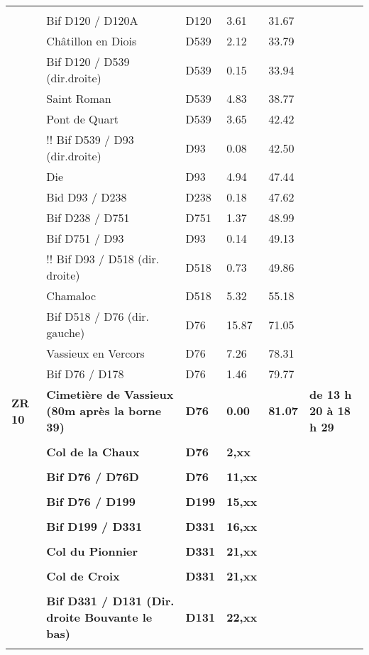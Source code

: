 \documentclass{article}%
\begin{document}
\begin{longtable}{p{2.25cm}|p{6.7cm}|p{2.0cm}|p{1.5cm}|p{1.5cm}|p{3.5cm}}
 & & & & & \\%
 &Bif D120 / D120A&D120&3.61&31.67& \\%
 &Châtillon en Diois&D539&2.12&33.79& \\%
 &Bif D120 / D539 (dir.droite)&D539&0.15&33.94& \\%
 &Saint Roman &D539&4.83&38.77& \\%
 &Pont de Quart&D539&3.65&42.42& \\%
 &!! Bif D539 / D93 (dir.droite)&D93&0.08&42.50& \\%
 &Die&D93&4.94&47.44& \\%
 &Bid D93 / D238&D238&0.18&47.62& \\%
 &Bif D238 / D751 &D751&1.37&48.99& \\%
 &Bif D751 / D93&D93&0.14&49.13& \\%
 &!! Bif D93 / D518 (dir. droite)&D518&0.73&49.86& \\%
 &Chamaloc&D518&5.32&55.18& \\%
 &Bif D518 / D76 (dir. gauche)&D76&15.87&71.05& \\%
 &Vassieux en Vercors&D76&7.26&78.31& \\%
 &Bif D76 / D178&D76&1.46&79.77& \\%
\textbf{ ZR 10 }&\textbf{Cimetière de Vassieux (80m après la borne 39)}&\textbf{D76}&\textbf{0.00}&\textbf{81.07}&\textbf{de 13 h 20 à 18 h 29}\\%
 & & & & & \\%
 &\textbf{Col de la Chaux}&\textbf{D76 }&\textbf{2,xx}& & \\%
 & & & & & \\%
 &\textbf{Bif D76 / D76D}&\textbf{D76}&\textbf{11,xx}& & \\%
 & & & & & \\%
 &\textbf{Bif D76 / D199}&\textbf{D199}&\textbf{15,xx}& & \\%
 & & & & & \\%
 &\textbf{Bif D199 / D331}&\textbf{D331}&\textbf{16,xx}& & \\%
 & & & & & \\%
 &\textbf{Col du Pionnier}&\textbf{D331}&\textbf{21,xx}& & \\%
 & & & & & \\%
 &\textbf{Col de Croix}&\textbf{D331}&\textbf{21,xx}& & \\%
 & & & & & \\%
 &\textbf{Bif D331 / D131 (Dir. droite Bouvante le bas)}&\textbf{D131}&\textbf{22,xx}& & \\%
 & & & & & \\%

\end{longtable}
\end{document}
